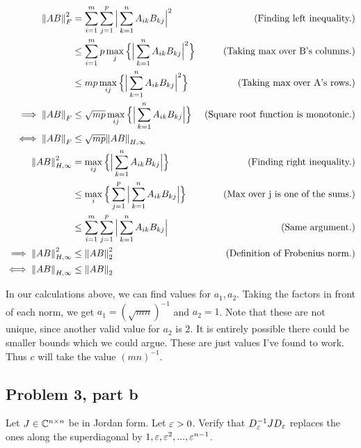 \begin{solution}
\alignbreak
\begin{align}
    \norm{AB}^2_F &= \sum_{i = 1}^m\sum_{j = 1}^p\Big|\sum_{k = 1}^nA_{ik}B_{kj}\Big|^2
    &\text{(Finding left inequality.)}\nonumber\\
    &\leq \sum_{i = 1}^mp\max_j \Big\{ \Big|\sum_{k = 1}^n A_{ik}B_{kj}\Big|^2\Big\}    &\text{(Taking max over B's columns.)}\nonumber\\
    &\leq mp\max_{ij}\Big\{ \Big| \sum_{k = 1}^nA_{ik}B_{kj}\Big|^2\Big\}   &\text{(Taking max over A's rows.)}\nonumber\\
    \implies \norm{AB}_F &\leq \sqrt{mp}\max_{ij}\Big\{\Big| \sum_{k = 1}^n A_{ik}B_{kj}\Big|\Big\} &\text{(Square root function is monotonic.)}\nonumber\\
    \iff \norm{AB}_F &\leq \sqrt{mp}\norm{AB}_{H, \infty}\label{p3a: left ineq}\\
    \norm{AB}^2_{H, \infty} &= \max_{ij}\Big\{\Big| \sum_{k = 1}^n A_{ik}B_{kj}\Big|\Big\} &\text{(Finding right inequality.)}\nonumber\\
    &\leq \max_{i}\Big\{\sum_{j = 1}^p\Big| \sum_{k = 1}^n A_{ik}B_{kj}\Big|\Big\} &\text{(Max over j is one of the sums.)}\nonumber\\
    &\leq \sum_{i = 1}^m\sum_{j = 1}^p\Big| \sum_{k = 1}^n A_{ik}B_{kj}\Big| &\text{(Same argument.)}\nonumber\\
    \implies \norm{AB}^2_{H, \infty} &\leq \norm{AB}_2^2 &\text{(Definition of Frobenius norm.)}\nonumber\\
    \iff \norm{AB}_{H, \infty} &\leq \norm{AB}_2\label{p3a: right ineq}
\end{align}

\alignbreak

In our calculations above, we can find values for $a_1, a_2$. Taking the factors in front of each norm, we get $a_1 = (\sqrt{mn})^{-1}$ and $a_2 = 1$. Note that these are not unique, since another valid value for $a_2$ is 2. It is entirely possible there could be smaller bounds which we could argue. These are just values I've found to work.  Thus $c$ will take the value $(mn)^{-1}$.

\newpage
\subsection{Problem 3, part b}
Let $J \in \mathbb{C}^{n\times n}$ be in Jordan form. Let $\varepsilon > 0$. Verify that $D^{-1}_\varepsilon J D_\varepsilon$ replaces the ones along the superdiagonal by $1, \varepsilon, \varepsilon^2, ..., \varepsilon^{n - 1}$.
\partbreak


\end{solution}

